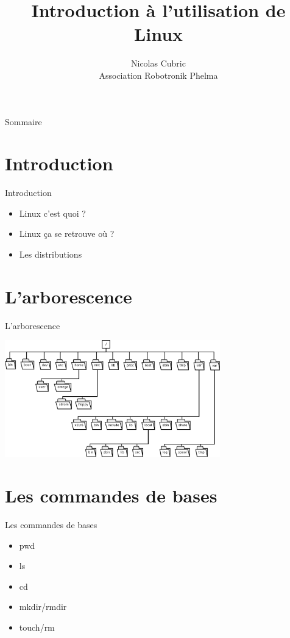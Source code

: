 \documentclass{beamer}
\title{Introduction à l'utilisation de Linux}
\author{Nicolas Cubric\\Association Robotronik Phelma}
\date{}
\begin{document}
\maketitle

\begin{frame}{Sommaire}
	\tableofcontents
\end{frame}

\section{Introduction}
\begin{frame}{Introduction}
	\begin{itemize}
		\item Linux c'est quoi ?
		\item Linux ça se retrouve où ?
		\item Les distributions
	\end{itemize}
\end{frame}

\section{L'arborescence}
\begin{frame}{L'arborescence}
	\begin{center}
		\includegraphics[width=0.7\textwidth]{Images/arborescence.png}
	\end{center}
\end{frame}

\section{Les commandes de bases}
\begin{frame}{Les commandes de bases}
	\begin{itemize}
		\item pwd
		\item ls
		\item cd
		\item mkdir/rmdir
		\item touch/rm
	\end{itemize}
\end{frame}
\end{document}
